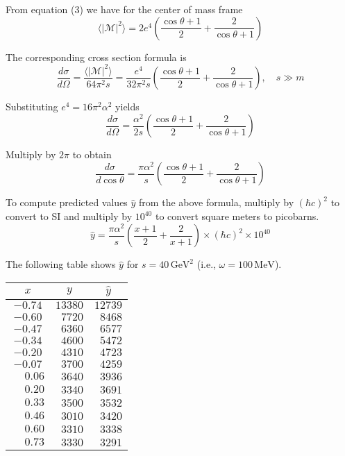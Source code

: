 \documentclass[12pt]{article}
\begin{document}
\noindent
From equation (3) we have for the center of mass frame
\begin{equation*}
\langle|\mathcal{M}|^2\rangle
=
2e^4\left(
\frac{\cos\theta+1}{2}+\frac{2}{\cos\theta+1}
\right)
\end{equation*}

\noindent
The corresponding cross section formula is
\begin{equation*}
\frac{d\sigma}{d\Omega}
=\frac{\langle|\mathcal{M}|^2\rangle}{64\pi^2s}
=\frac{e^4}{32\pi^2s}
\left(
\frac{\cos\theta+1}{2}+\frac{2}{\cos\theta+1}
\right),\quad s\gg m
\end{equation*}

\noindent
Substituting $e^4=16\pi^2\alpha^2$ yields
\begin{equation*}
\frac{d\sigma}{d\Omega}
=\frac{\alpha^2}{2s}
\left(
\frac{\cos\theta+1}{2}+\frac{2}{\cos\theta+1}
\right)
\end{equation*}

\noindent
Multiply by $2\pi$ to obtain
\begin{equation*}
\frac{d\sigma}{d\cos\theta}
=\frac{\pi\alpha^2}{s}\left(
\frac{\cos\theta+1}{2}+\frac{2}{\cos\theta+1}
\right)
\end{equation*}

\noindent
To compute predicted values $\hat{y}$ from the above formula,
multiply by $(\hbar c)^2$ to convert to SI
and multiply by $10^{40}$ to convert square meters to picobarns.
\begin{equation*}
\hat{y}
=
\frac{\pi\alpha^2}{s}
\left(
\frac{x+1}{2}+
\frac{2}{x+1}
\right)
\times(\hbar c)^2
\times10^{40}
\end{equation*}

\noindent
The following table shows $\hat{y}$
for $s=40\,\text{GeV}^2$ (i.e., $\omega=100\,\text{MeV}$).

\begin{center}
\begin{tabular}{|c|c|c|}
\hline
$x$ & $y$ & $\hat{y}$\\
\hline
$-0.74$ & $13380$ & $12739$\\
$-0.60$ & $\phantom{0}7720$ & $\phantom{0}8468$\\
$-0.47$ & $\phantom{0}6360$ & $\phantom{0}6577$\\
$-0.34$ & $\phantom{0}4600$ & $\phantom{0}5472$\\
$-0.20$ & $\phantom{0}4310$ & $\phantom{0}4723$\\
$-0.07$ & $\phantom{0}3700$ & $\phantom{0}4259$\\
$\phantom{+}0.06$ & $\phantom{0}3640$ & $\phantom{0}3936$\\
$\phantom{+}0.20$ & $\phantom{0}3340$ & $\phantom{0}3691$\\
$\phantom{+}0.33$ & $\phantom{0}3500$ & $\phantom{0}3532$\\
$\phantom{+}0.46$ & $\phantom{0}3010$ & $\phantom{0}3420$\\
$\phantom{+}0.60$ & $\phantom{0}3310$ & $\phantom{0}3338$\\
$\phantom{+}0.73$ & $\phantom{0}3330$ & $\phantom{0}3291$\\
\hline
\end{tabular}
\end{center}
\end{document}
